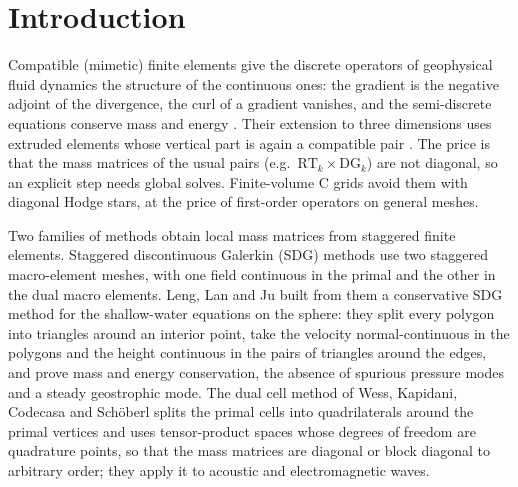 \documentclass[preprint,12pt]{elsarticle}
\theoremstyle{definition}
\begin{document}
\section{Introduction}\label{sec:intro}

Compatible (mimetic) finite elements give the discrete operators of geophysical fluid dynamics the
structure of the continuous ones: the gradient is the negative adjoint of the divergence, the curl of a
gradient vanishes, and the semi-discrete equations conserve mass and energy
\cite{CotterShipton2012,McRaeCotter2014,NataleShiptonCotter2016}. Their extension to three dimensions
uses extruded elements whose vertical part is again a compatible pair \cite{NataleShiptonCotter2016,Melvin2019}.
The price is that the mass matrices of the usual pairs (e.g.\ $\mathrm{RT}_k\times\mathrm{DG}_k$) are not
diagonal, so an explicit step needs global solves. Finite-volume C grids \cite{Thuburn2009,Ringler2010,Zaengl2015}
avoid them with diagonal Hodge stars, at the price of first-order operators on general meshes.

Two families of methods obtain local mass matrices from staggered finite elements. Staggered
discontinuous Galerkin (SDG) methods \cite{ChungEngquist2006,ChungLamQian2015,DuChung2021} use two
staggered macro-element meshes, with one field continuous in the primal and the other in the dual macro
elements. Leng, Lan and Ju \cite{LengLanJu2026} built from them a conservative SDG method for the
shallow-water equations on the sphere: they split every polygon into triangles around an interior point,
take the velocity normal-continuous in the polygons and the height continuous in the pairs of triangles
around the edges, and prove mass and energy conservation, the absence of spurious pressure modes and a
steady geostrophic mode. The dual cell method of Wess, Kapidani, Codecasa and Sch\"oberl \cite{Wess2024}
splits the primal cells into quadrilaterals around the primal vertices and uses tensor-product spaces
whose degrees of freedom are quadrature points, so that the mass matrices are diagonal or block diagonal
to arbitrary order; they apply it to acoustic and electromagnetic waves.
\end{document}
